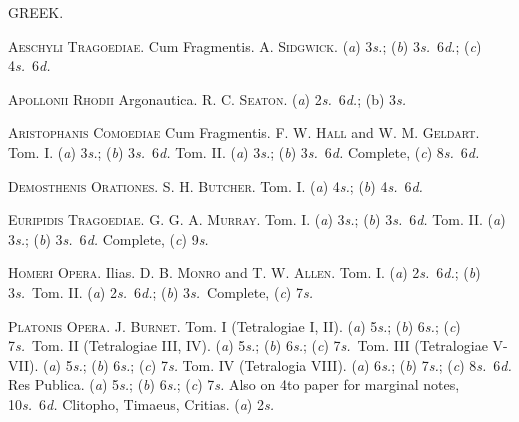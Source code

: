 \documentclass[12pt,oneside]{book}[2021/10/04]
\newenvironment{advlist}{
  \begin{description}[leftmargin=1em, parsep=0.2ex, listparindent=1em,]
}{\end{description}}
\newcommand{\¬}{\hphantom{0}}
\begin{document}
\begin{center}
GREEK.
\end{center}

\begin{advlist}
\item[\mdseries\textsc{Aeschyli Tragoediae.}] Cum
Fragmentis. \textsc{A. Sidgwick.} (\textit{a})
3\textit{s.}; (\textit{b}) 3\textit{s.}\ 6\textit{d.}; (\textit{c}) 4\textit{s.}\ 6\textit{d.}

\item[\mdseries\textsc{Apollonii Rhodii}] Argonautica.
\textsc{R. C. Seaton.} (\textit{a}) 2\textit{s.}\ 6\textit{d.}; (b) 3\textit{s.}

\item[\mdseries\textsc{Aristophanis Comoediae}] Cum
Fragmentis. \textsc{F. W. Hall} and
\textsc{W. M. Geldart}. Tom. I. (\textit{a})
3\textit{s.}; (\textit{b}) 3\textit{s.}\ 6\textit{d.} Tom. II. (\textit{a}) 3\textit{s.};
(\textit{b}) 3\textit{s.}\ 6\textit{d.} Complete, (\textit{c}) 8\textit{s.}\ 6\textit{d.}

\item[\mdseries\textsc{Demosthenis Orationes.}] \textsc{S. H.
Butcher.} Tom. I. (\textit{a}) 4\textit{s.}; (\textit{b})
4\textit{s.}\ 6\textit{d.}

\item[\mdseries\textsc{Euripidis Tragoediae.}] \textsc{G. G. A.
Murray.} Tom. I. (\textit{a}) 3\textit{s.}; (\textit{b})
3\textit{s.}\ 6\textit{d.} Tom. II. (\textit{a}) 3\textit{s.}; (\textit{b}) 3\textit{s.}\ 6\textit{d.}
Complete, (\textit{c}) 9\textit{s.}

\item[\mdseries\textsc{Homeri Opera.}] Ilias. \textsc{D. B.
Monro} and \textsc{T. W. Allen}. Tom.
I. (\textit{a}) 2\textit{s.}\ 6\textit{d.}; (\textit{b}) 3\textit{s.}\ Tom. II.
(\textit{a}) 2\textit{s.}\ 6\textit{d.}; (\textit{b}) 3\textit{s.}\ Complete, (\textit{c}) 7\textit{s.}

\item[\mdseries\textsc{Platonis Opera.}] \textsc{J. Burnet.}
Tom. I (Tetralogiae I, II). (\textit{a})
5\textit{s.}; (\textit{b}) 6\textit{s.}; (\textit{c}) 7\textit{s.}\ Tom. II
(Tetralogiae III, IV). (\textit{a}) 5\textit{s.};
(\textit{b}) 6\textit{s.}; (\textit{c}) 7\textit{s.}\ Tom. III (Tetralogiae
V-VII). (\textit{a}) 5\textit{s.}; (\textit{b}) 6\textit{s.}; (\textit{c}) 7\textit{s.}
Tom. IV (Tetralogia VIII). (\textit{a}) 6\textit{s.};
(\textit{b}) 7\textit{s.}; (\textit{c}) 8\textit{s.}\ 6\textit{d.} Res Publica.
(\textit{a}) 5\textit{s.}; (\textit{b}) 6\textit{s.}; (\textit{c}) 7\textit{s.} Also on 4to
paper for marginal notes, 10\textit{s.}\ 6\textit{d.}
Clitopho, Timaeus, Critias. (\textit{a}) 2\textit{s.}


\end{advlist}
\end{document}
